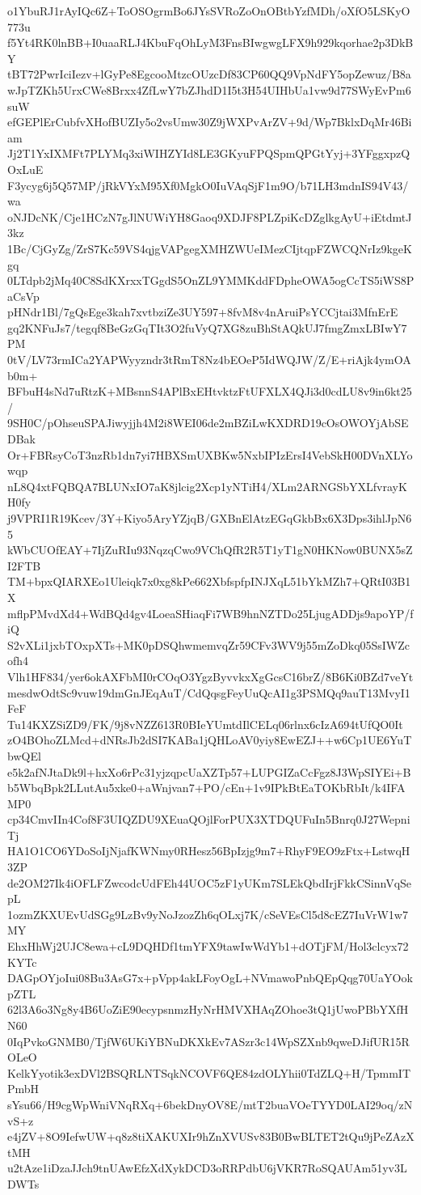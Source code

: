 o1YbuRJ1rAyIQc6Z+ToOSOgrmBo6JYsSVRoZoOnOBtbYzfMDh/oXfO5LSKyO773u
f5Yt4RK0lnBB+I0uaaRLJ4KbuFqOhLyM3FnsBIwgwgLFX9h929kqorhae2p3DkBY
tBT72PwrIciIezv+lGyPe8EgcooMtzcOUzcDf83CP60QQ9VpNdFY5opZewuz/B8a
wJpTZKh5UrxCWe8Brxx4ZfLwY7bZJhdD1I5t3H54UIHbUa1vw9d77SWyEvPm6suW
efGEPlErCubfvXHofBUZIy5o2vsUmw30Z9jWXPvArZV+9d/Wp7BklxDqMr46Biam
Jj2T1YxIXMFt7PLYMq3xiWIHZYId8LE3GKyuFPQSpmQPGtYyj+3YFggxpzQOxLuE
F3ycyg6j5Q57MP/jRkVYxM95Xf0MgkO0IuVAqSjF1m9O/b71LH3mdnIS94V43/wa
oNJDcNK/Cje1HCzN7gJlNUWiYH8Gaoq9XDJF8PLZpiKcDZglkgAyU+iEtdmtJ3kz
1Bc/CjGyZg/ZrS7Kc59VS4qjgVAPgegXMHZWUeIMezCIjtqpFZWCQNrIz9kgeKgq
0LTdpb2jMq40C8SdKXrxxTGgdS5OnZL9YMMKddFDpheOWA5ogCcTS5iWS8PaCsVp
pHNdr1Bl/7gQsEge3kah7xvtbziZe3UY597+8fvM8v4nAruiPsYCCjtai3MfnErE
gq2KNFuJs7/tegqf8BeGzGqTIt3O2fuVyQ7XG8zuBhStAQkUJ7fmgZmxLBIwY7PM
0tV/LV73rmICa2YAPWyyzndr3tRmT8Nz4bEOeP5IdWQJW/Z/E+riAjk4ymOAb0m+
BFbuH4sNd7uRtzK+MBsnnS4APlBxEHtvktzFtUFXLX4QJi3d0cdLU8v9in6kt25/
9SH0C/pOhseuSPAJiwyjjh4M2i8WEI06de2mBZiLwKXDRD19cOsOWOYjAbSEDBak
Or+FBRsyCoT3nzRb1dn7yi7HBXSmUXBKw5NxbIPIzErsI4VebSkH00DVnXLYowqp
nL8Q4xtFQBQA7BLUNxIO7aK8jlcig2Xcp1yNTiH4/XLm2ARNGSbYXLfvrayKH0fy
j9VPRI1R19Kcev/3Y+Kiyo5AryYZjqB/GXBnElAtzEGqGkbBx6X3Dps3ihlJpN65
kWbCUOfEAY+7IjZuRIu93NqzqCwo9VChQfR2R5T1yT1gN0HKNow0BUNX5sZI2FTB
TM+bpxQIARXEo1Uleiqk7x0xg8kPe662XbfspfpINJXqL51bYkMZh7+QRtI03B1X
mflpPMvdXd4+WdBQd4gv4LoeaSHiaqFi7WB9hnNZTDo25LjugADDjs9apoYP/fiQ
S2vXLi1jxbTOxpXTs+MK0pDSQhwmemvqZr59CFv3WV9j55mZoDkq05SsIWZcofh4
Vlh1HF834/yer6okAXFbMI0rCOqO3YgzByvvkxXgGcsC16brZ/8B6Ki0BZd7veYt
mesdwOdtSc9vuw19dmGnJEqAuT/CdQqsgFeyUuQcAI1g3PSMQq9auT13MvyI1FeF
Tu14KXZSiZD9/FK/9j8vNZZ613R0BIeYUmtdIlCELq06rlnx6cIzA694tUfQO0It
zO4BOhoZLMcd+dNRsJb2dSI7KABa1jQHLoAV0yiy8EwEZJ++w6Cp1UE6YuTbwQEl
e5k2afNJtaDk9l+hxXo6rPc31yjzqpcUaXZTp57+LUPGIZaCcFgz8J3WpSIYEi+B
b5WbqBpk2LLutAu5xke0+aWnjvan7+PO/cEn+1v9IPkBtEaTOKbRbIt/k4IFAMP0
cp34CmvIIn4Cof8F3UIQZDU9XEuaQOjlForPUX3XTDQUFuIn5Bnrq0J27WepniTj
HA1O1CO6YDoSoIjNjafKWNmy0RHesz56BpIzjg9m7+RhyF9EO9zFtx+LstwqH3ZP
de2OM27Ik4iOFLFZwcodcUdFEh44UOC5zF1yUKm7SLEkQbdIrjFkkCSinnVqSepL
1ozmZKXUEvUdSGg9LzBv9yNoJzozZh6qOLxj7K/cSeVEsCl5d8cEZ7IuVrW1w7MY
EhxHhWj2UJC8ewa+cL9DQHDf1tmYFX9tawIwWdYb1+dOTjFM/Hol3clcyx72KYTc
DAGpOYjoIui08Bu3AsG7x+pVpp4akLFoyOgL+NVmawoPnbQEpQqg70UaYOokpZTL
62l3A6o3Ng8y4B6UoZiE90ecypsnmzHyNrHMVXHAqZOhoe3tQ1jUwoPBbYXfHN60
0IqPvkoGNMB0/TjfW6UKiYBNuDKXkEv7ASzr3c14WpSZXnb9qweDJifUR15ROLeO
KelkYyotik3exDVl2BSQRLNTSqkNCOVF6QE84zdOLYhii0TdZLQ+H/TpmmITPmbH
sYsu66/H9cgWpWniVNqRXq+6bekDnyOV8E/mtT2buaVOeTYYD0LAI29oq/zNvS+z
e4jZV+8O9IefwUW+q8z8tiXAKUXIr9hZnXVUSv83B0BwBLTET2tQu9jPeZAzXtMH
u2tAze1iDzaJJch9tnUAwEfzXdXykDCD3oRRPdbU6jVKR7RoSQAUAm51yv3LDWTs
